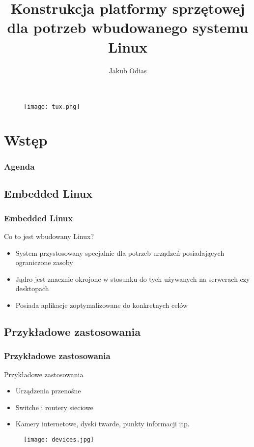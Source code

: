 \documentclass{beamer}
\newenvironment{ramka}{\begin{frame}}
{
		\end{frame}
}
\begin{document}
	\title[Embedded Linux]{Konstrukcja platformy sprzętowej dla potrzeb wbudowanego systemu Linux}
	\author{Jakub Odias}
	
	\begin{frame}
		\titlepage
		\begin{figure}[b]
			\texttt{[image: tux.png]} 
		\end{figure}
	\end{frame}
	
	\section{Wstęp}
	\begin{ramka}
		\frametitle{Agenda}
		\tableofcontents
	\end{ramka} 
	
	\subsection{Embedded Linux}
	\begin{ramka}
		\frametitle{Embedded Linux}
		\begin{block}{Co to jest wbudowany Linux?}
			\begin{itemize}
				\item<2-> System przystosowany specjalnie dla potrzeb urządzeń posiadających ograniczone zasoby
				\item<3-> Jądro jest znacznie okrojone w stosunku do tych używanych na serwerach czy desktopach
				\item<4-> Posiada aplikacje zoptymalizowane do konkretnych celów
			\end{itemize}
		\end{block}

	\end{ramka} 
	
	\subsection{Przykładowe zastosowania}
	\begin{ramka}
		\frametitle{Przykładowe zastosowania}
		\begin{block}{Przykładowe zastosowania}
		\begin{itemize}
				\item<2->Urządzenia przenośne
				\item<3-> Switche i routery sieciowe
				\item<4-> Kamery internetowe, dyski twarde, punkty informacji itp.
			\end{itemize}
			\begin{figure}[b]
		\texttt{[image: devices.jpg]} 
		\end{figure}
		\end{block}
	\end{ramka} 
	
\end{document}
